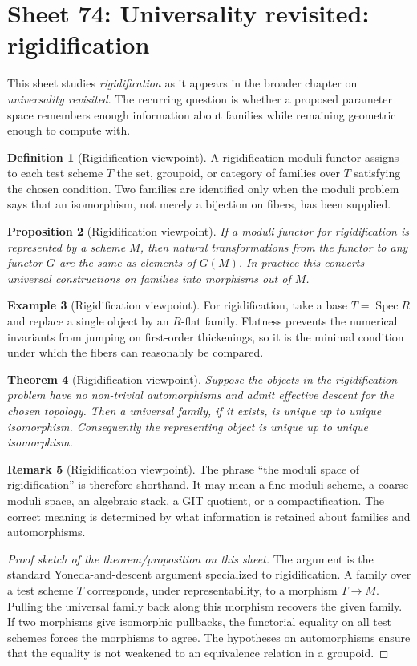 \documentclass[11pt]{amsart}
\newtheorem{theorem}{Theorem}[section]
\newtheorem{proposition}[theorem]{Proposition}
\theoremstyle{definition}
\newtheorem{definition}[theorem]{Definition}
\newtheorem{example}[theorem]{Example}
\newtheorem{remark}[theorem]{Remark}
\newcommand{\Spec}{\operatorname{Spec}}
\begin{document}
\section{Sheet 74: Universality revisited: rigidification}
This sheet studies \emph{rigidification} as it appears in the broader chapter on \emph{universality revisited}.  The recurring question is whether a proposed parameter space remembers enough information about families while remaining geometric enough to compute with.
\begin{definition}[Rigidification viewpoint]
A rigidification moduli functor assigns to each test scheme $T$ the set, groupoid, or category of families over $T$ satisfying the chosen condition.  Two families are identified only when the moduli problem says that an isomorphism, not merely a bijection on fibers, has been supplied.
\end{definition}
\begin{proposition}[Rigidification viewpoint]
If a moduli functor for rigidification is represented by a scheme $M$, then natural transformations from the functor to any functor $G$ are the same as elements of $G(M)$.  In practice this converts universal constructions on families into morphisms out of $M$.
\end{proposition}
\begin{example}[Rigidification viewpoint]
For rigidification, take a base $T=\Spec R$ and replace a single object by an $R$-flat family.  Flatness prevents the numerical invariants from jumping on first-order thickenings, so it is the minimal condition under which the fibers can reasonably be compared.
\end{example}
\begin{theorem}[Rigidification viewpoint]
Suppose the objects in the rigidification problem have no non-trivial automorphisms and admit effective descent for the chosen topology.  Then a universal family, if it exists, is unique up to unique isomorphism.  Consequently the representing object is unique up to unique isomorphism.
\end{theorem}
\begin{remark}[Rigidification viewpoint]
The phrase ``the moduli space of rigidification'' is therefore shorthand.  It may mean a fine moduli scheme, a coarse moduli space, an algebraic stack, a GIT quotient, or a compactification.  The correct meaning is determined by what information is retained about families and automorphisms.
\end{remark}
\begin{proof}[Proof sketch of the theorem/proposition on this sheet]
The argument is the standard Yoneda-and-descent argument specialized to rigidification.  A family over a test scheme $T$ corresponds, under representability, to a morphism $T\to M$.  Pulling the universal family back along this morphism recovers the given family.  If two morphisms give isomorphic pullbacks, the functorial equality on all test schemes forces the morphisms to agree.  The hypotheses on automorphisms ensure that the equality is not weakened to an equivalence relation in a groupoid.
\end{proof}
\end{document}
